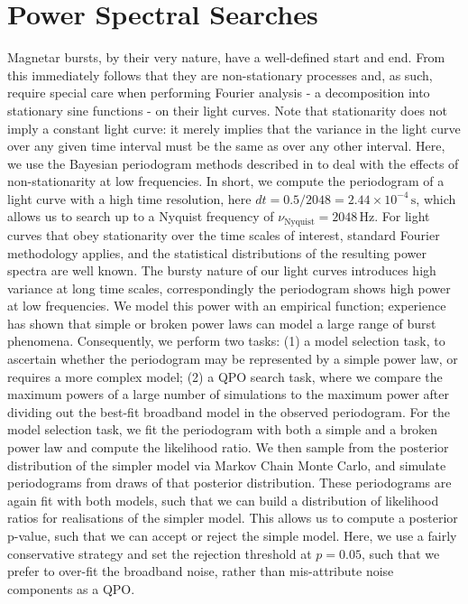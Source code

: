 \documentclass[numberedappendix]{emulateapj}
\begin{document}
\section{Power Spectral Searches}
\label{sec:analysis}

Magnetar bursts, by their very nature, have a well-defined start and end. From this immediately follows that they are non-stationary processes and, as such, require special care when performing Fourier analysis - a decomposition into stationary sine functions - on their light curves. Note that stationarity does not imply a constant light curve: it merely implies that the variance in the light curve over any given time interval must be the same as over any other interval. 
Here, we use the Bayesian periodogram methods described in \citet{huppenkothen2013} to deal with the effects of non-stationarity at low frequencies. In short, we compute the periodogram of a light curve with a high time resolution, here $dt = 0.5/2048 = 2.44 \times 10^{-4} \, \mathrm{s}$, which allows us to search up to a Nyquist frequency of $\nu_{\mathrm{Nyquist}} = 2048 \, \mathrm{Hz}$. For light curves that obey stationarity over the time scales of interest, standard Fourier methodology applies, and the statistical distributions of the resulting power spectra are well known. The bursty nature of our light curves introduces high variance at long time scales, correspondingly the periodogram shows high power at low frequencies. We model this power with an empirical function; experience has shown that simple or broken power laws can model a large range of burst phenomena. Consequently, we perform two tasks: (1) a model selection task, to ascertain whether the periodogram may be represented by a simple power law, or requires a more complex model; (2) a QPO search task, where we compare the maximum powers of a large number of simulations to the maximum power after dividing out the best-fit broadband model in the observed periodogram. For the model selection task, we fit the periodogram with both a simple and a broken power law and compute the likelihood ratio. We then sample from the posterior distribution of the simpler model via Markov Chain Monte Carlo, and simulate periodograms from draws of that posterior distribution. These periodograms are again fit with both models, such that we can build a distribution of likelihood ratios for realisations of the simpler model. This allows us to compute a posterior p-value, such that we can accept or reject the simple model. Here, we use a fairly conservative strategy and set the rejection threshold at $p = 0.05$, such that we prefer to over-fit the broadband noise, rather than mis-attribute noise components as a QPO.
\end{document}
